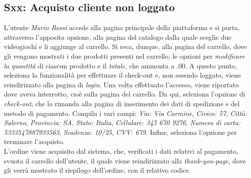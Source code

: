 \documentclass[12pt, a4paper, oneside]{book}
\begin{document}
    \subsection*{Sxx: Acquisto cliente non loggato}
        L'utente \textit{Mario Rossi} accede alla pagina principale della piattaforma e si porta, attraverso l'apposita opzione, alla pagina
        del catalogo dalla quale sceglie due videogiochi e li aggiunge al carrello. Si reca, dunque, alla pagina del carrello, dove gli vengono mostrati i due prodotti presenti
        nel carrello, le opzioni per \textit{modificare la quantità} di ciascun prodotto e il \textit{totale}, che ammonta a ,00. A questo punto, seleziona la funzionalità
        per effettuare il check-out e, non essendo loggato, viene reindirizzato alla pagina di \textit{login}. Una volta effettuato l'accesso, viene riportato dove aveva
        interrotto, cioè sulla pagina del carrello.
        Da qui, seleziona l'opzione di \textit{check-out}, che lo rimanda alla pagina di inserimento dei dati di spedizione e del metodo di pagamento. Compila i vari campi:
        \textit{Via: Via Carmine}, \textit{Civico: 57}, \textit{Città: Salerno}, \textit{Provincia: SA}, \textit{Stato: Italia}, \textit{Cellulare: 345 670 9276},
        \textit{Numero di carta: 5333547887933563}, \textit{Scadenza: 10/25}, \textit{CVV: 679}. Infine, seleziona l'opzione per terminare l'acquisto.\\
        L'ordine viene acquisito dal sistema, che, verificati i dati relativi al pagamento, svuota il carrello dell'utente, il quale viene
        reindirizzato alla \textit{thank-you-page}, dove gli verrà mostrato il riepilogo dell'ordine, con il relativo codice.
\end{document}
